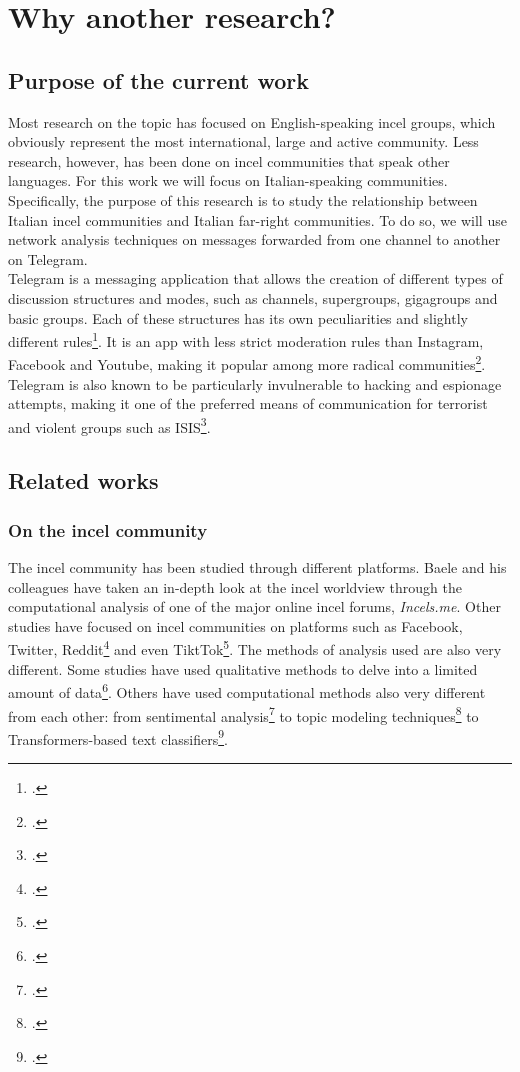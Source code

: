 \documentclass[a4paper,twoside,12pt, openany]{book}
\begin{document}
\section{Why another research?}
\subsection*{Purpose of the current work}
Most research on the topic has focused on English-speaking incel groups, which obviously represent the most international, large and active community. Less research, however, has been done on incel communities that speak other languages. For this work we will focus on Italian-speaking communities. Specifically, the purpose of this research is to study the relationship between Italian incel communities and Italian far-right communities. To do so, we will use network analysis techniques on messages forwarded from one channel to another on Telegram. \\

Telegram is a messaging application that allows the creation of  different types of discussion structures and modes, such as channels, supergroups, gigagroups and basic groups. Each of these structures has its own peculiarities and slightly different rules\footcite{channelTelegram}. It is an app with less strict moderation rules than Instagram, Facebook and Youtube, making it popular among more radical communities\footcite{rogers2020}. Telegram is also known to be particularly invulnerable to hacking and espionage attempts, making it one of the preferred means of communication for terrorist and violent groups such as ISIS\footcite{weimann2016}.
\subsection*{Related works}

\subsubsection*{On the incel community}
The incel community has been studied through different platforms. Baele and his colleagues have taken an in-depth look at the incel worldview through the computational analysis of one of the major online incel forums, \emph{Incels.me}. Other studies have focused on incel communities on platforms such as Facebook, Twitter, Reddit\footcite{deroos2024} and even TiktTok\footcite{solea2023}. The methods of analysis used are also very different. Some studies have used qualitative methods to delve into a limited amount of data\footcite{solea2023}. Others have used computational methods also very different from each other: from sentimental analysis\footcite{hajarian2021} to topic modeling techniques\footcite{jelodar2021} to Transformers-based text classifiers\footcite{pelzer2021}.
\end{document}
